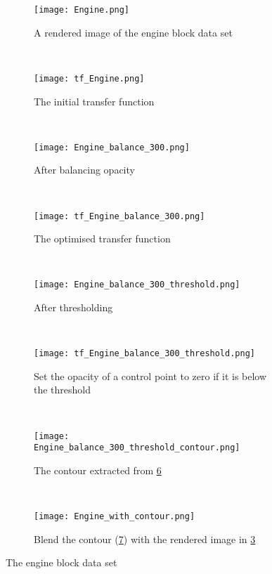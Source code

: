 \begin{figure}
	\centering
	\begin{subfigure}[b]{0.24\textwidth}
		\centering
		\texttt{[image: Engine.png]}
		\caption{A rendered image of the engine block data set}
		\label{fig:Engine}
	\end{subfigure}~
	\begin{subfigure}[b]{0.24\textwidth}
		\centering
		\texttt{[image: tf\_Engine.png]}
		\caption{The initial transfer function}
		\label{fig:tf_Engine}
	\end{subfigure}~
	\begin{subfigure}[b]{0.24\textwidth}
		\centering
		\texttt{[image: Engine\_balance\_300.png]}
		\caption{After balancing opacity}
		\label{fig:Engine_balance_300}
	\end{subfigure}~
	\begin{subfigure}[b]{0.24\textwidth}
		\centering
		\texttt{[image: tf\_Engine\_balance\_300.png]}
		\caption{The optimised transfer function}
		\label{fig:tf_Engine_balance_300.png}
	\end{subfigure}
	~ %
	\begin{subfigure}[b]{0.24\textwidth}
		\centering
		\texttt{[image: Engine\_balance\_300\_threshold.png]}
		\caption{After thresholding}
		\label{fig:Engine_balance_300_threshold}
	\end{subfigure}~    
	\begin{subfigure}[b]{0.24\textwidth}
		\centering
		\texttt{[image: tf\_Engine\_balance\_300\_threshold.png]}
		\caption{Set the opacity of a control point to zero if it is below the threshold}
		\label{fig:tf_Engine_balance_300_threshold.png}
	\end{subfigure}~
	\begin{subfigure}[b]{0.24\textwidth}
		\centering
		\texttt{[image: Engine\_balance\_300\_threshold\_contour.png]}
		\caption{The contour extracted from \ref{fig:tf_Engine_balance_300_threshold.png}}
		\label{fig:Engine_balance_300_threshold_contour}
	\end{subfigure}~
	\begin{subfigure}[b]{0.24\textwidth}
		\centering
		\texttt{[image: Engine\_with\_contour.png]}
		\caption{Blend the contour (\ref{fig:Engine_balance_300_threshold_contour}) with the rendered image in \ref{fig:Engine_balance_300}}
		\label{fig:Engine_with_contour}
	\end{subfigure}
	\caption{The engine block data set}
	\label{fig:multiple_Engine_with_contour}
\end{figure}

